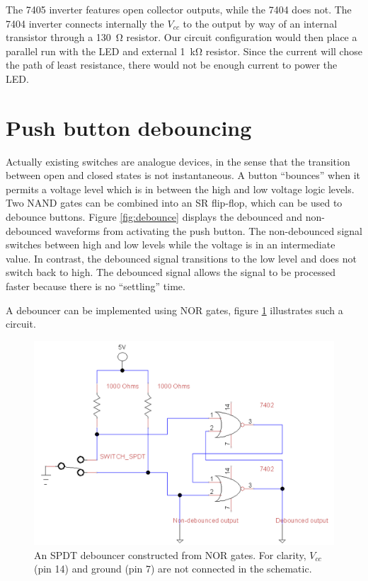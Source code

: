 \documentclass[11pt]{article}
\begin{document}
The 7405 inverter features open collector outputs, while the 7404 does not. The 7404 inverter connects internally the $V_{cc}$ to the output by way of an internal transistor through a \SI{130}{\ohm} resistor. Our circuit configuration would then place a parallel run with the LED and external \SI{1}{\kilo\ohm} resistor. Since the current will chose the path of least resistance, there would not be enough current to power the LED. 

\section{Push button debouncing}

Actually existing switches are analogue devices, in the sense that the transition between open and closed states is not instantaneous. A button ``bounces'' when it permits a voltage level which is in between the high and low voltage logic levels. Two NAND gates can be combined into an SR flip-flop, which can be used to debounce buttons. Figure \ref{fig:debounce} displays the debounced and non-debounced waveforms from activating the push button. The non-debounced signal switches between high and low levels while the voltage is in an intermediate value. In contrast, the debounced signal transitions to the low level and does not switch back to high. The debounced signal allows the signal to be processed faster because there is no ``settling'' time.

A debouncer can be implemented using NOR gates, figure \ref{fig:nor_gates} illustrates such a circuit. 

\begin{figure}[h]
	\centering
	\includegraphics[scale=0.5, draft=false]{nor_gates}
	\caption{An SPDT debouncer constructed from NOR gates. For clarity, $V_{cc}$ (pin 14) and ground (pin 7) are not connected in the schematic.}
	\label{fig:nor_gates}
\end{figure}
\end{document}
